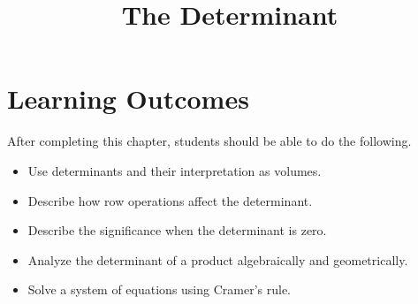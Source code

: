 \documentclass{ximera}
\title{The Determinant}
\begin{document}
\begin{abstract}

\end{abstract}
 
\maketitle
 
\section*{Learning Outcomes}
After completing this chapter, students should be able to do the following.
 
\begin{itemize}
    \item Use determinants and their interpretation as volumes.
    \item Describe how row operations affect the determinant. 
    \item Describe the significance when the determinant is zero. 
    \item Analyze the determinant of a product algebraically and geometrically.
    \item Solve a system of equations using Cramer's rule.
    
    
\end{itemize}

 
\end{document}
